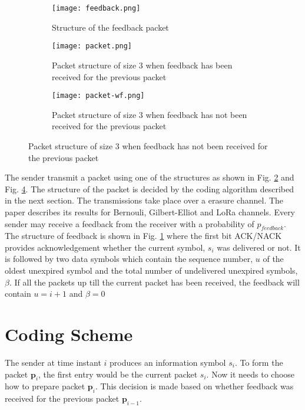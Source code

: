 \begin{figure}[h]
	\centering
	\begin{subfigure}
		\centering
		\texttt{[image: feedback.png]}
		\caption{Structure of the feedback packet}
		\label{feedback}
	\end{subfigure}
	
	\vspace{5ex}
	
	\begin{subfigure}
		\centering
		\texttt{[image: packet.png]}
		\caption{Packet structure of size 3 when feedback has been received for the previous packet}
		\label{packet}
	\end{subfigure}
	
	\vspace{5ex}
	
	\begin{subfigure}
		\centering
		\texttt{[image: packet-wf.png]}
		\caption{Packet structure of size 3 when feedback has not been received for the previous packet}
		\label{packet-wf}
	\end{subfigure}
	
\end{figure}

The sender transmit a packet using one of the structures as shown in Fig. \ref{packet} and Fig. \ref{packet-wf}. The structure of the packet is decided by the coding algorithm described in the next section. The transmissions take place over a erasure channel. The paper \cite{borkotokyicc} describes its results for Bernouli, Gilbert-Elliot and LoRa channels. Every sender may receive a feedback from the receiver with a probability of $p_{feedback}$. The structure of feedback is shown in Fig. \ref{feedback} where the first bit ACK/NACK provides acknowledgement whether the current symbol, $s_i$ was delivered or not. It is followed by two data symbols which contain the sequence number, $u$ of the oldest unexpired symbol and the total number of undelivered unexpired symbols, $\beta$. If all the packets up till the current packet has been received, the feedback will contain $u=i+1$ and $\beta = 0$


\section{Coding Scheme}

The sender at time instant $i$ produces an information symbol $s_i$. To form the packet $\mathbf{p}_i$, the first entry would be the current packet $s_i$. Now it needs to choose how to prepare packet $\mathbf{p}_i$. This decision is made based on whether feedback was received for the previous packet $\mathbf{p}_{i-1}$.

